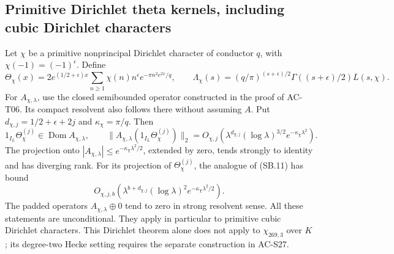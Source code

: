 \subsection{Primitive Dirichlet theta kernels, including cubic Dirichlet characters}

\begin{theorem}
\label{AC-S25}
Let \(\chi\) be a primitive nonprincipal Dirichlet character of
conductor \(q\), with \(\chi(-1)=(-1)^\epsilon\).  Define
\[
 \Theta_\chi(x)=
  2e^{(1/2+\epsilon)x}
       \sum_{n\geq1}\chi(n)n^\epsilon
                     e^{-\pi n^2e^{2x}/q},\qquad
 \Lambda_\chi(s)=
 (q/\pi)^{(s+\epsilon)/2}
       \Gamma((s+\epsilon)/2)L(s,\chi).
                                                               \tag{SB.12}
\]
For \(A_{\chi,\lambda}\), use the closed semibounded operator
constructed in the proof of AC-T06.  Its compact resolvent also
follows there without assuming \(A\).
Put \(d_{\chi,j}=1/2+\epsilon+2j\) and \(\kappa_\chi=\pi/q\).
Then
\[
 1_{I_L}\Theta_\chi^{(j)}
             \in\operatorname{Dom}A_{\chi,\lambda},\qquad
 \|A_{\chi,\lambda}(1_{I_L}\Theta_\chi^{(j)})\|_2
   =O_{\chi,j}\!\left(
       \lambda^{d_{\chi,j}}(\log\lambda)^{3/2}
                                      e^{-\kappa_\chi\lambda^2}\right).
                                                               \tag{SB.13}
\]
The projection onto
\(|A_{\chi,\lambda}|\leq e^{-\kappa_\chi\lambda^2/2}\), extended
by zero, tends strongly to identity and has diverging rank.
For its projection of \(\Theta_\chi^{(j)}\), the analogue of
(SB.11) has bound
\[
 O_{\chi,j,b}\!\left(
 \lambda^{b+d_{\chi,j}}(\log\lambda)^2
                               e^{-\kappa_\chi\lambda^2/2}\right).
                                                               \tag{SB.14}
\]
The padded operators \(A_{\chi,\lambda}\oplus0\) tend to zero
in strong resolvent sense.  All these statements are unconditional.
They apply in particular to primitive cubic Dirichlet characters.
This Dirichlet theorem alone does not apply to
\(\chi_{269,3}\) over \(K\); its degree-two Hecke setting requires
the separate construction in AC-S27.
\end{theorem}
